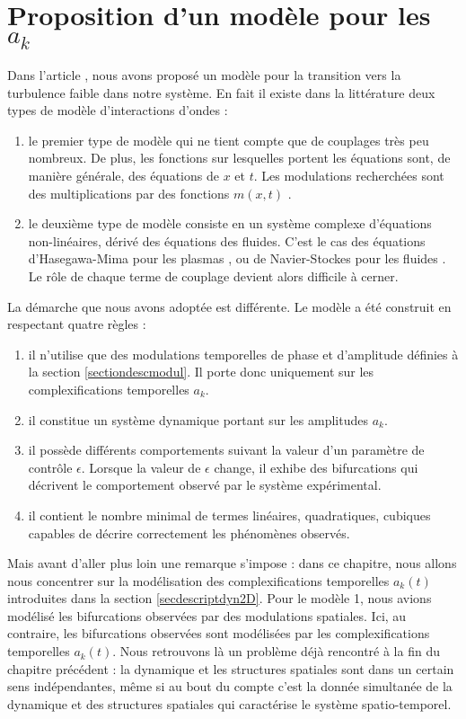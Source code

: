 \documentclass{book}
\begin{document}
\section{Proposition d'un mod\`ele pour les $a_k$}
Dans l'article \cite{Madon96b}, nous avons propos\'e un 
mod\`ele pour
la transition vers la turbulence faible 
dans notre syst\`eme.
En fait il existe dans la litt\'erature deux types de mod\`ele
d'interactions d'ondes :
\begin{enumerate}
\item le premier type de mod\`ele qui ne tient compte que de couplages
tr\`es peu nombreux. De plus, les fonctions sur lesquelles portent les
\'equations sont, de mani\`ere g\'en\'erale, des \'equations de $x$ et
$t$. Les modulations recherch\'ees sont des multiplications par des
fonctions $m(x,t)$ \cite{Craik85,Bers75,Kaup79}.
\item le deuxi\`eme type de mod\`ele consiste en un syst\`eme complexe
d'\'equations non-lin\'eaires, d\'eriv\'e des \'equations des fluides.
C'est le cas des \'equations d'Hasegawa-Mima pour les plasmas
\cite{Hasegawa77,Hasegawa78,Hasegawa79}, ou de Navier-Stockes pour les
fluides \cite{LandauFlu}. Le r\^ole de chaque terme de couplage
devient alors difficile \`a cerner.
\end{enumerate}
La d\'emarche que nous avons adopt\'ee est diff\'erente. Le mod\`ele
 a \'et\'e construit  en respectant quatre r\`egles :
\begin{enumerate}
\item il n'utilise que des modulations temporelles de
phase  et
d'amplitude d\'efinies \`a la section \ref{sectiondescmodul}. Il
porte donc uniquement sur les complexifications temporelles $a_k$.
\item il constitue un syst\`eme dynamique portant sur les amplitudes
$a_k$. 
\item il poss\`ede diff\'erents comportements suivant la valeur d'un
param\`etre de contr\^ole $\epsilon$. Lorsque la valeur de $\epsilon$
change, il exhibe des bifurcations qui d\'ecrivent le comportement
observ\'e par le syst\`eme exp\'erimental.
\item il contient le nombre minimal de termes lin\'eaires,
quadratiques, cubiques capables de d\'ecrire correctement les
ph\'enom\`enes observ\'es.
\end{enumerate}
Mais avant d'aller plus loin une remarque s'impose : dans ce chapitre,
nous allons nous concentrer sur la mod\'elisation des
complexifications temporelles $a_k(t)$ introduites dans la section
\ref{secdescriptdyn2D}. Pour le mod\`ele 1, nous avions
mod\'elis\'e les bifurcations observ\'ees par des modulations
spatiales.  Ici, au contraire, les bifurcations observ\'ees sont
mod\'elis\'ees par les
complexifications temporelles $a_k(t)$. Nous
retrouvons l\`a un probl\`eme d\'ej\`a rencontr\'e \`a la fin du
chapitre pr\'ec\'edent : la dynamique et les structures spatiales sont
dans un certain sens ind\'ependantes, m\^eme si au bout du compte c'est
la donn\'ee simultan\'ee de la dynamique et des structures spatiales
qui caract\'erise le syst\`eme spatio-temporel.
\end{document}
